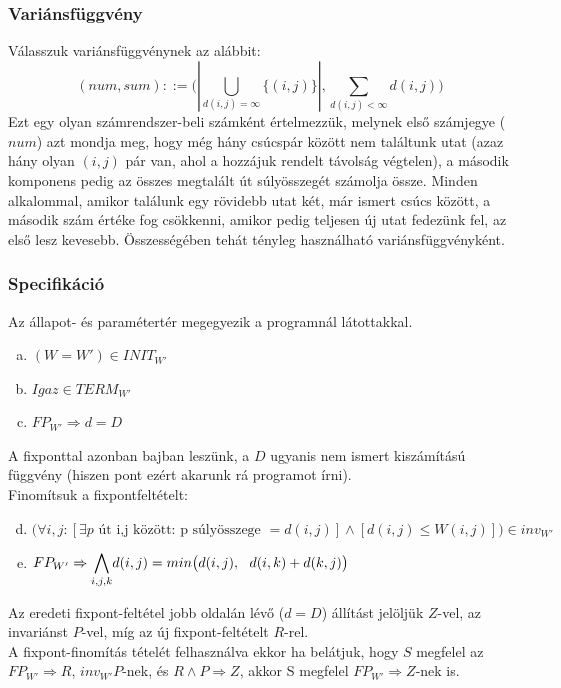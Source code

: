 \documentclass[12pt]{article}
\begin{document}
	\subsubsection{Variánsfüggvény}
	Válasszuk variánsfüggvénynek az alábbit:
	$$(num, sum) ::= \big(|\bigcup\limits_{d(i,j)=\infty} \{(i,j)\}|, \sum_{d(i,j)< \infty } d(i,j) \big)$$
	Ezt egy olyan számrendszer-beli számként értelmezzük, melynek első számjegye ($num$) azt mondja meg, hogy még hány csúcspár között nem találtunk utat (azaz hány olyan $(i,j)$ pár van, ahol a hozzájuk rendelt távolság végtelen), a második komponens pedig az összes megtalált út súlyösszegét számolja össze. Minden alkalommal, amikor találunk egy rövidebb utat két, már ismert csúcs között, a második szám értéke fog csökkenni, amikor pedig teljesen új utat fedezünk fel, az első lesz kevesebb. Összességében tehát tényleg használható variánsfüggvényként.
	
	\subsubsection{Specifikáció}
	Az állapot- és paramétertér megegyezik a programnál látottakkal.
	\begin{enumerate}[(a)]
		\item $(W = W') \in INIT_{W'}$
		\item $Igaz \in TERM_{W'}$
		\item $FP_{W'} \Rightarrow d = D$
	\end{enumerate}
	A fixponttal azonban bajban leszünk, a $D$ ugyanis nem ismert kiszámítású függvény (hiszen pont ezért akarunk rá programot írni).\\
	Finomítsuk a fixpontfeltételt:
	\begin{enumerate}[(a)]
		\setcounter{enumi}{3}
		\item $\big(\forall i,j: [\exists p \text{ út i,j között: p súlyösszege }=d(i,j)] \land [d(i,j)\le W(i,j)]\big) \in inv_{W'}$
		\item $FP_{W'} \Rightarrow {\mathlarger\bigwedge\limits_{i,j,k}} d(i,j) = min\big(d(i,j),\ \ d(i,k) + d(k,j)\big)$
	\end{enumerate}
	Az eredeti fixpont-feltétel jobb oldalán lévő ($d=D$) állítást jelöljük $Z$-vel, az invariánst $P$-vel, míg az új fixpont-feltételt $R$-rel.\\
	A fixpont-finomítás tételét felhasználva ekkor ha belátjuk, hogy $S$ megfelel az $FP_{W'} \Rightarrow R$, $inv_{W'}P$-nek, és $R \land P \Rightarrow Z$, akkor S megfelel $FP_{W'} \Rightarrow Z$-nek is.
	
\end{document}
